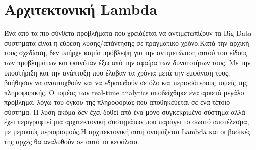 \chapter{Αρχιτεκτονική Lambda}
Ένα από τα πιο σύνθετα προβλήματα που χρειάζεται να αντιμετωπίζουν τα Big Data συστήματα είναι η εύρεση λύσης/απάντησης σε πραγματικό χρόνο.Κατά την αρχική τους σχεδίαση, δεν υπήρχε καμία πρόβλεψη για την αντιμετώπιση αυτού του είδους των προβλημάτων και φαινόταν έξω από την σφαίρα των δυνατοτήτων τους. Με την υποστήριξη και την ανάπτυξη που έλαβαν τα χρόνια μετά την εμφάνιση τους, βοήθησαν να αναπτυχθούν και να εδραιωθούν σε όλο και περισσότερους τομείς της πληροφορικής. Ο τομέας των real-time analytics αποδείχθηκε ένα αρκετά μεγάλο πρόβλημα, λόγω του όγκου της πληροφορίας που αποθηκεύεται σε ένα τέτοιο σύστημα. Η λύση ακόμα δεν έχει δοθεί από ένα μόνο συγκεκριμένο σύστημα αλλά έχει περιγραφτεί μια αρχιτεκτονική συστημάτων που παράγει το σωστό αποτέλεσμα, με μερικούς περιορισμούς.Η αρχιτεκτονική αυτή ονομάζεται Lambda και οι βασικές της αρχές θα αναλυθούν σε αυτό το κεφάλαιο.

